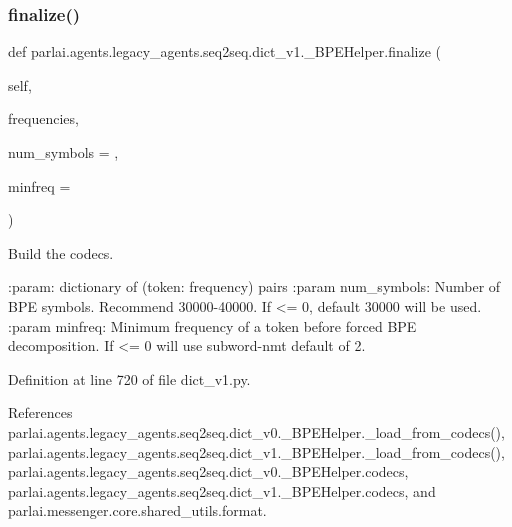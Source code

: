 \subsubsection{\texorpdfstring{finalize()}{finalize()}}
{\footnotesize\ttfamily def parlai.\+agents.\+legacy\+\_\+agents.\+seq2seq.\+dict\+\_\+v1.\+\_\+\+B\+P\+E\+Helper.\+finalize (\begin{DoxyParamCaption}\item[{}]{self,  }\item[{}]{frequencies,  }\item[{}]{num\+\_\+symbols = {},  }\item[{}]{minfreq = {} }\end{DoxyParamCaption})}

\begin{DoxyVerb}Build the codecs.

:param: dictionary of (token: frequency) pairs
:param num_symbols: Number of BPE symbols. Recommend 30000-40000.
    If <= 0, default 30000 will be used.
:param minfreq: Minimum frequency of a token before forced BPE
    decomposition. If <= 0 will use subword-nmt default of 2.
\end{DoxyVerb}
 

Definition at line 720 of file dict\+\_\+v1.\+py.



References parlai.\+agents.\+legacy\+\_\+agents.\+seq2seq.\+dict\+\_\+v0.\+\_\+\+B\+P\+E\+Helper.\+\_\+load\+\_\+from\+\_\+codecs(), parlai.\+agents.\+legacy\+\_\+agents.\+seq2seq.\+dict\+\_\+v1.\+\_\+\+B\+P\+E\+Helper.\+\_\+load\+\_\+from\+\_\+codecs(), parlai.\+agents.\+legacy\+\_\+agents.\+seq2seq.\+dict\+\_\+v0.\+\_\+\+B\+P\+E\+Helper.\+codecs, parlai.\+agents.\+legacy\+\_\+agents.\+seq2seq.\+dict\+\_\+v1.\+\_\+\+B\+P\+E\+Helper.\+codecs, and parlai.\+messenger.\+core.\+shared\+\_\+utils.\+format.

